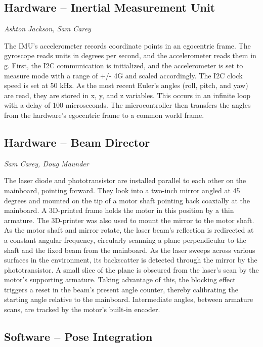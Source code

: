 \documentclass[twocolumn]{article}
\begin{document}
\subsection{Hardware -- Inertial Measurement Unit}

\emph{Ashton Jackson, Sam Carey}

The IMU’s accelerometer records coordinate points in an egocentric frame. The
gyroscope reads units in degrees per second, and the accelerometer reads them in
g. First, the I2C communication is initialized, and the accelerometer is set to
measure mode with a range of +/- 4G and scaled accordingly. The I2C clock speed
is set at 50 kHz. As the most recent Euler’s angles (roll, pitch, and yaw) are
read, they are stored in x, y, and z variables. This occurs in an infinite loop
with a delay of 100 microseconds. The microcontroller then transfers the angles
from the hardware’s egocentric frame to a common world frame.

\subsection{Hardware -- Beam Director}

\emph{Sam Carey, Doug Maunder}

The laser diode and phototransistor are installed parallel to each other on the
mainboard, pointing forward. They look into a two-inch mirror angled at 45
degrees and mounted on the tip of a motor shaft pointing back coaxially at the
mainboard. A 3D-printed frame holds the motor in this position by a thin
armature. The 3D-printer was also used to mount the mirror to the motor
shaft. As the motor shaft and mirror rotate, the laser beam’s reflection is
redirected at a constant angular frequency, circularly scanning a plane
perpendicular to the shaft and the fixed beam from the mainboard. As the laser
sweeps across various surfaces in the environment, its backscatter is detected
through the mirror by the phototransistor. A small slice of the plane is
obscured from the laser’s scan by the motor’s supporting armature. Taking
advantage of this, the blocking effect triggers a reset in the beam’s present
angle counter, thereby calibrating the starting angle relative to the
mainboard. Intermediate angles, between armature scans, are tracked by the
motor’s built-in encoder.

\subsection{Software -- Pose Integration}
\end{document}
